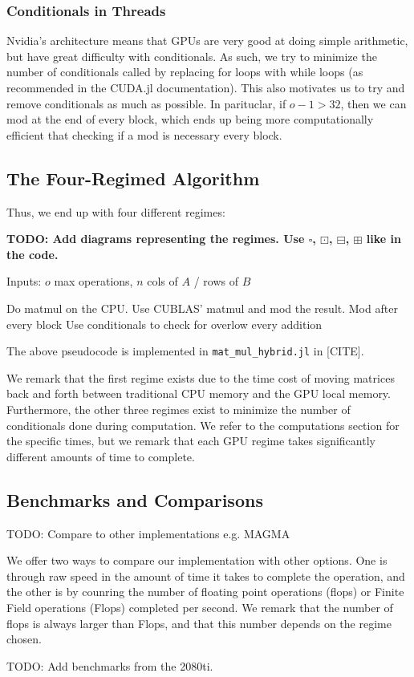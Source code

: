 \subsubsection{Conditionals in Threads}

Nvidia's architecture means that GPUs are very good at doing simple arithmetic, but have great difficulty with conditionals. As such, we try to minimize the number of conditionals called by replacing for loops with while loops (as recommended in the CUDA.jl documentation). This also motivates us to try and remove conditionals as much as possible. In parituclar, if $o - 1 > 32$, then we can mod at the end of every block, which ends up being more computationally efficient that checking if a mod is necessary every block.

\subsection{The Four-Regimed Algorithm}

Thus, we end up with four different regimes:

\textbf{TODO: Add diagrams representing the regimes. Use $\square$, $\boxdot$, $\boxminus$, $\boxplus$ like in the code.}

\begin{alg}
    Inputs: $o$ max operations, $n$ cols of $A$ / rows of $B$
    \begin{algorithmic}
            \State Do matmul on the CPU.
            \State Use CUBLAS' matmul and mod the result.
            \State Mod after every block
        \Else
            \State Use conditionals to check for overlow every addition
        \EndIf
    \end{algorithmic}
\end{alg}
The above pseudocode is implemented in \texttt{mat\_mul\_hybrid.jl} in [CITE].

We remark that the first regime exists due to the time cost of moving matrices back and forth between traditional CPU memory and the GPU local memory. Furthermore, the other three regimes exist to minimize the number of conditionals done during computation. We refer to the computations section for the specific times, but we remark that each GPU regime takes significantly different amounts of time to complete.

\subsection{Benchmarks and Comparisons}

TODO: Compare to other implementations e.g. MAGMA

We offer two ways to compare our implementation with other options. One is through raw speed in the amount of time it takes to complete the operation, and the other is by counring the number of floating point operations (flops) or Finite Field operations (Flops) completed per second. We remark that the number of flops is always larger than Flops, and that this number depends on the regime chosen.

TODO: Add benchmarks from the 2080ti.
